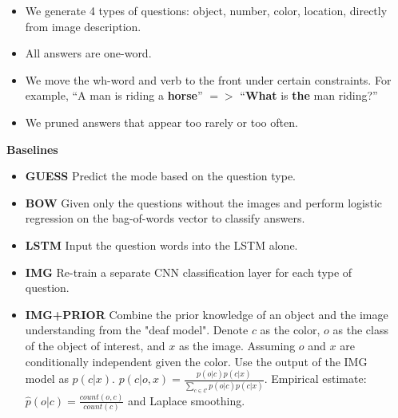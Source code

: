 \documentclass[serif,mathserif,final]{beamer}
\renewcommand{\*}[1]{\textbf{#1}}
\begin{document}
\begin{frame}{}
\begin{columns}[t]
\begin{column}{0.32\linewidth}
\endminipage
\end{column}

\begin{column}{0.32\linewidth}
\minipage[c][0.9\textheight][s]{\columnwidth}

\begin{block}{}
\begin{itemize}
    \item We generate 4 types of questions: object, number, color, location, 
    directly from image description.
    \item All answers are one-word.
    \item We move the wh-word and verb to the front under certain constraints. 
    For example, ``A man is riding a \*{horse}'' $=>$ ``\*{What} is \*{the} man 
    riding?''
    \item We pruned answers that appear too rarely or too often.
\end{itemize}
\end{block}
\vfill

\begin{block}{\bf{\large Baselines}}
  \begin{itemize}
  \item \*{GUESS} Predict the mode based on the question type.
  \item \*{BOW} Given only the questions without the images and perform logistic regression on the bag-of-words vector to classify answers.
  \item \*{LSTM} Input the question words into the LSTM alone.
  \item \*{IMG} Re-train a separate CNN classification layer for each type of question.
  \item \*{IMG+PRIOR} Combine the prior knowledge of an object and the image understanding from the "deaf model". Denote $c$ as the color, $o$ as the class of the   object of interest, and $x$ as the image. Assuming $o$ and $x$ are conditionally independent given the color. Use the output of the IMG model as $p(c | x)$. $p(c | o, x) = \frac{p(o | c) p(c | x)}{\sum_{c \in \mathcal{C}}  p(o | c) p(c | x)}$. Empirical estimate: $\hat{p}(o | c) = \frac{count(o, c)}{count(c)}$ and Laplace smoothing.
  \end{itemize}
\end{block}
\vfill


\end{column}
\end{columns}
\end{frame}
\end{document}
